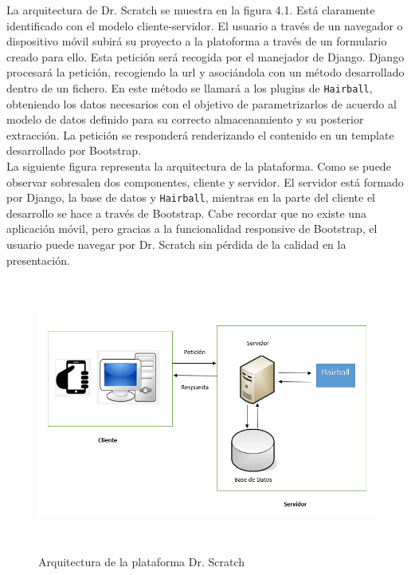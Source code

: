 \documentclass[a4paper, 12pt]{book}
\begin{document}
La arquitectura de Dr. Scratch se muestra en la figura 4.1. Está claramente identificado
con el modelo cliente-servidor. El usuario a través de un navegador o dispositivo móvil
subirá su proyecto a la platoforma a través de un formulario creado para ello. Esta 
petición será recogida por el manejador de Django. Django procesará la petición, recogiendo
la url y asociándola con un método desarrollado dentro de un fichero. En este método
se llamará a los plugins de \texttt{Hairball}, obteniendo los datos necesarios con el
objetivo de parametrizarlos de acuerdo  al modelo de datos definido para su correcto 
almacenamiento y su posterior extracción. La petición se responderá renderizando 
el contenido en un template desarrollado por Bootstrap. \\


La siguiente figura representa la arquitectura de la plataforma. Como se puede observar
sobresalen dos componentes, cliente y servidor. El servidor está formado por Django,
la base de datos y \texttt{Hairball}, mientras en la parte del cliente el desarrollo
se hace a través de Bootstrap. Cabe recordar que no existe una aplicación móvil, 
pero gracias a la funcionalidad responsive de Bootstrap, el usuario puede 
navegar por Dr. Scratch sin pérdida de la calidad en la presentación. \\


\begin{figure}
  \centering
	\graphicspath{{img/}}
  \includegraphics[bb=0 0 800 600, width=18cm, height=9cm, keepaspectratio]{arquitecturascratch.png}
	\caption{Arquitectura de la plataforma Dr. Scratch}
  \label{figura:foro_hilos}
\end{figure}
\end{document}
